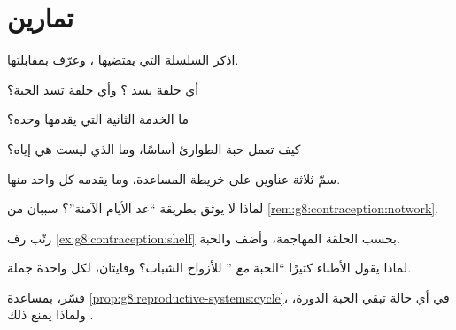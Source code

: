 \section{تمارين}

\begin{exercise}[$\star$]\label{exo:g8:contraception:1}
اذكر السلسلة التي يقتضيها ، وعرّف 
بمقابلتها.
\end{exercise}

\begin{exercise}[$\star$]\label{exo:g8:contraception:2}
أي حلقة يسد ؟ وأي حلقة تسد الحبة؟
\end{exercise}

\begin{exercise}[$\star$]\label{exo:g8:contraception:3}
ما الخدمة الثانية التي يقدمها  وحده؟
\end{exercise}

\begin{exercise}[$\star$]\label{exo:g8:contraception:4}
كيف تعمل حبة الطوارئ أساسًا، وما الذي ليست هي إياه؟
\end{exercise}

\begin{exercise}[$\star$]\label{exo:g8:contraception:5}
سمّ ثلاثة عناوين على خريطة المساعدة، وما يقدمه كل واحد
منها.
\end{exercise}

\begin{exercise}[$\star$]\label{exo:g8:contraception:6}
لماذا لا يوثق بطريقة ``عد الأيام الآمنة''؟ سببان من
\cref{rem:g8:contraception:notwork}.
\end{exercise}

\begin{exercise}[$\star\star$]\label{exo:g8:contraception:7}
رتّب رف \cref{ex:g8:contraception:shelf} بحسب الحلقة
المهاجمة، وأضف  والحبة.
\end{exercise}

\begin{exercise}[$\star\star$]\label{exo:g8:contraception:8}
لماذا يقول الأطباء كثيرًا ``الحبة \emph{مع} ''
للأزواج الشباب؟ وقايتان، لكل واحدة جملة.
\end{exercise}

\begin{exercise}[$\star\star$]\label{exo:g8:contraception:9}
فسّر، بمساعدة
\cref{prop:g8:reproductive-systems:cycle}، في أي حالة
تبقي الحبة الدورة، ولماذا يمنع ذلك .
\end{exercise}

